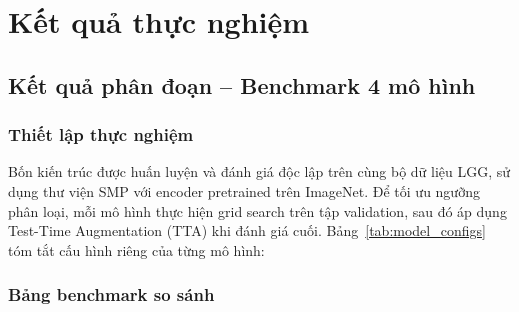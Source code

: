 
\chapter{Kết quả thực nghiệm}

\label{Chapter4}


\section{Kết quả phân đoạn -- Benchmark 4 mô hình}

\subsection{Thiết lập thực nghiệm}

Bốn kiến trúc được huấn luyện và đánh giá độc lập trên cùng bộ dữ liệu LGG, sử dụng thư viện SMP \cite{Yakubovskiy2019} với encoder pretrained trên ImageNet. Để tối ưu ngưỡng phân loại, mỗi mô hình thực hiện grid search trên tập validation, sau đó áp dụng Test-Time Augmentation (TTA) khi đánh giá cuối. Bảng~\ref{tab:model_configs} tóm tắt cấu hình riêng của từng mô hình:

\begin{table}[h!]
    \centering
    \caption{Cấu hình thực nghiệm của bốn mô hình được đánh giá.}
    \label{tab:model_configs}
\end{table}

\subsection{Bảng benchmark so sánh}

